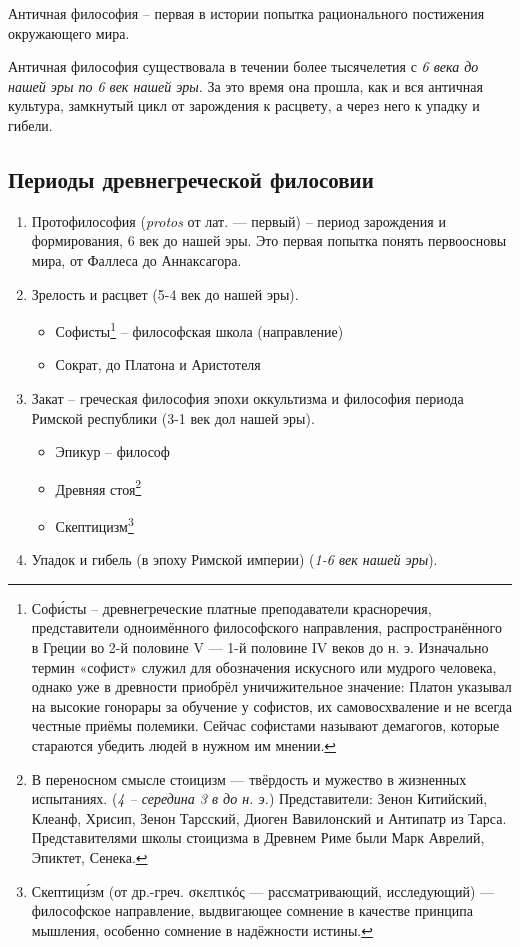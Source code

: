 \documentclass[a4paper, 14pt]{extreport}
\begin{document}
Античная философия -- первая в истории попытка рационального постижения
окружающего мира.

Античная философия существовала в течении более тысячелетия с \emph{6
века до нашей эры по 6 век нашей эры}. За это время она прошла, как и
вся античная культура, замкнутый цикл от зарождения к расцвету, а через
него к упадку и гибели.

\subsection{Периоды древнегреческой филосовии}

\begin{enumerate}
\def\labelenumi{\arabic{enumi}.}
\item
  Протофилософия (\emph{protos} от лат. --- первый) -- период зарождения
  и формирования, 6 век до нашей эры. Это первая попытка понять
  первоосновы мира, от Фаллеса до Аннаксагора.
\item
  Зрелость и расцвет (5-4 век до нашей эры).

  \begin{itemize}
  
  \item
    Софисты\footnote{Софи́сты -- древнегреческие платные преподаватели
      красноречия, представители одноимённого философского направления,
      распространённого в Греции во 2-й половине V --- 1-й половине IV
      веков до н. э. Изначально термин «софист» служил для обозначения
      искусного или мудрого человека, однако уже в древности приобрёл
      уничижительное значение: Платон указывал на высокие гонорары за
      обучение у софистов, их самовосхваление и не всегда честные приёмы
      полемики. Сейчас софистами называют демагогов, которые стараются
      убедить людей в нужном им мнении.} -- философская школа
    (направление)
  \item
    Сократ, до Платона и Аристотеля
  \end{itemize}
\item
  Закат -- греческая философия эпохи оккультизма и философия периода
  Римской республики (3-1 век дол нашей эры).

  \begin{itemize}
  
  \item
    Эпикур -- философ
  \item
    Древняя стоя\footnote{В переносном смысле стоицизм --- твёрдость и
      мужество в жизненных испытаниях. (\emph{4 -- середина 3 в до н.
      э.}) Представители: Зенон Китийский, Клеанф, Хрисип, Зенон
      Тарсский, Диоген Вавилонский и Антипатр из Тарса. Представителями
      школы стоицизма в Древнем Риме были Марк Аврелий, Эпиктет, Сенека.}
  \item
    Скептицизм\footnote{Скептици́зм (от др.-греч. σκεπτικός ---
      рассматривающий, исследующий) --- философское направление,
      выдвигающее сомнение в качестве принципа мышления, особенно
      сомнение в надёжности истины.}
  \end{itemize}
\item
  Упадок и гибель (в эпоху Римской империи) (\emph{1-6 век нашей эры}).


\end{enumerate}
\end{document}
